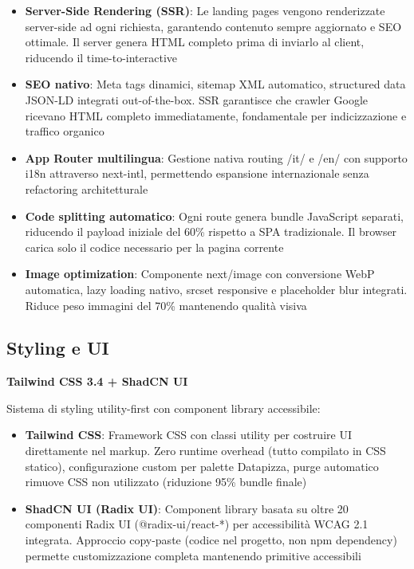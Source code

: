 \begin{itemize}
  \item \textbf{Server-Side Rendering (SSR)}: Le landing pages vengono renderizzate server-side ad ogni richiesta, garantendo contenuto sempre aggiornato e SEO ottimale. Il server genera HTML completo prima di inviarlo al client, riducendo il time-to-interactive
  
  \item \textbf{SEO nativo}: Meta tags dinamici, sitemap XML automatico, structured data JSON-LD integrati out-of-the-box. SSR garantisce che crawler Google ricevano HTML completo immediatamente, fondamentale per indicizzazione e traffico organico
  
  \item \textbf{App Router multilingua}: Gestione nativa routing /it/ e /en/ con supporto i18n attraverso next-intl, permettendo espansione internazionale senza refactoring architetturale
  
  \item \textbf{Code splitting automatico}: Ogni route genera bundle JavaScript separati, riducendo il payload iniziale del 60\% rispetto a SPA tradizionale. Il browser carica solo il codice necessario per la pagina corrente
  
  \item \textbf{Image optimization}: Componente next/image con conversione WebP automatica, lazy loading nativo, srcset responsive e placeholder blur integrati. Riduce peso immagini del 70\% mantenendo qualità visiva
\end{itemize}

\subsection{Styling e UI}

\textbf{Tailwind CSS 3.4 + ShadCN UI}

Sistema di styling utility-first con component library accessibile:

\begin{itemize}
  \item \textbf{Tailwind CSS}: Framework CSS con classi utility per costruire UI direttamente nel markup. Zero runtime overhead (tutto compilato in CSS statico), configurazione custom per palette Datapizza, purge automatico rimuove CSS non utilizzato (riduzione 95\% bundle finale)
  
  \item \textbf{ShadCN UI (Radix UI)}: Component library basata su oltre 20 componenti Radix UI (@radix-ui/react-*) per accessibilità WCAG 2.1 integrata. Approccio copy-paste (codice nel progetto, non npm dependency) permette customizzazione completa mantenendo primitive accessibili
\end{itemize}

